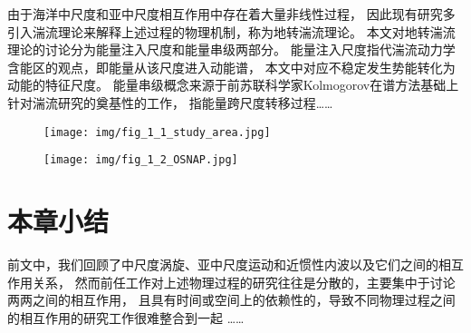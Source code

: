 由于海洋中尺度和亚中尺度相互作用中存在着大量非线性过程，
因此现有研究多引入湍流理论来解释上述过程的物理机制，称为地转湍流理论。
本文对地转湍流理论的讨论分为能量注入尺度和能量串级两部分。
能量注入尺度指代湍流动力学含能区的观点，即能量从该尺度进入动能谱，
本文中对应不稳定发生势能转化为动能的特征尺度。
能量串级概念来源于前苏联科学家Kolmogorov在谱方法基础上针对湍流研究的奠基性的工作，
指能量跨尺度转移过程……

\begin{figure}[htbp]
  \centering
  \texttt{[image: img/fig\_1\_1\_study\_area.jpg]}
  \label{fig:enter-label-1}
\end{figure}

\begin{figure}[htbp]
  \centering
  \texttt{[image: img/fig\_1\_2\_OSNAP.jpg]}
  \label{fig:enter-label-2}
\end{figure}

\section{本章小结}

前文中，我们回顾了中尺度涡旋、亚中尺度运动和近惯性内波以及它们之间的相互作用关系，
然而前任工作对上述物理过程的研究往往是分散的，主要集中于讨论两两之间的相互作用，
且具有时间或空间上的依赖性的，导致不同物理过程之间的相互作用的研究工作很难整合到一起
……